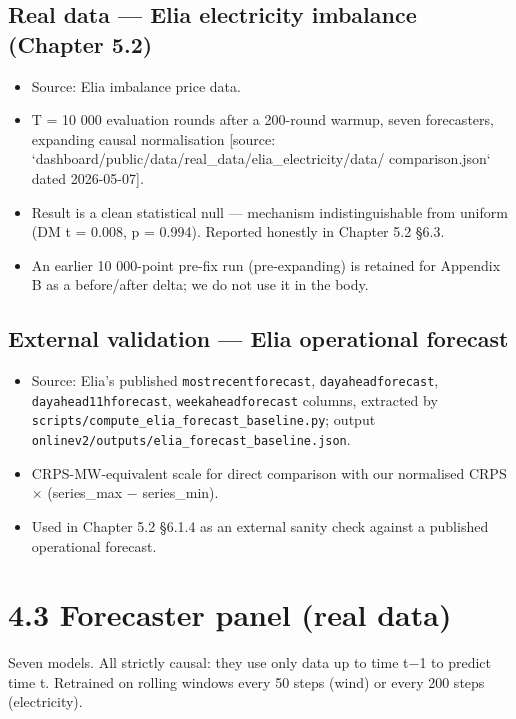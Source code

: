 \documentclass[11pt,a4paper,openany]{report}
\begin{document}
\subsection{Real data — Elia electricity imbalance (Chapter 5.2)}

\begin{itemize}
  \item Source: Elia imbalance price data.
  \item T = 10 000 evaluation rounds after a 200-round warmup, seven
    forecasters, expanding causal normalisation
    [source: `dashboard/public/data/real\_data/elia\_electricity/data/
    comparison.json` dated 2026-05-07].
  \item Result is a clean statistical null — mechanism indistinguishable
    from uniform (DM t = 0.008, p = 0.994). Reported honestly in
    Chapter 5.2 §6.3.
  \item An earlier 10 000-point pre-fix run (pre-expanding) is retained for
    Appendix B as a before/after delta; we do not use it in the body.
\end{itemize}

\subsection{External validation — Elia operational forecast}

\begin{itemize}
  \item Source: Elia's published \texttt{mostrecentforecast}, \texttt{dayaheadforecast},
    \texttt{dayahead11hforecast}, \texttt{weekaheadforecast} columns, extracted by
    \texttt{scripts/compute\_elia\_forecast\_baseline.py}; output
    \texttt{onlinev2/outputs/elia\_forecast\_baseline.json}.
  \item CRPS-MW-equivalent scale for direct comparison with our
    normalised CRPS × (series\_max − series\_min).
  \item Used in Chapter 5.2 §6.1.4 as an external sanity check against a
    published operational forecast.
\end{itemize}

\section{4.3 Forecaster panel (real data)}

Seven models. All strictly causal: they use only data up to time t−1 to
predict time t. Retrained on rolling windows every 50 steps (wind) or
every 200 steps (electricity).
\end{document}
